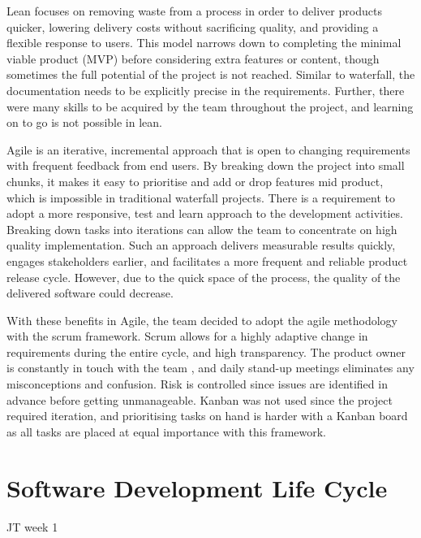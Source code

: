 Lean focuses on removing waste from a process in order to deliver products quicker, lowering delivery costs without sacrificing quality, and providing a flexible response to users. This model narrows down to completing the minimal viable product (MVP) before considering extra features or content, though sometimes the full potential of the project is not reached. Similar to waterfall, the documentation needs to be explicitly precise in the requirements. Further, there were many skills to be acquired by the team throughout the project, and learning on to go is not possible in lean.

Agile is an iterative, incremental approach that is open to changing requirements with frequent feedback from end users. By breaking down the project into small chunks, it makes it easy to prioritise and add or drop features mid product, which is impossible in traditional waterfall projects. There is a requirement to adopt a more responsive, test and learn approach to the development activities. Breaking down tasks into iterations can allow the team to concentrate on high quality implementation. Such an approach delivers measurable results quickly, engages stakeholders earlier, and facilitates a more frequent and reliable product release cycle. However, due to the quick space of the process, the quality of the delivered software could decrease.

With these benefits in Agile, the team decided to adopt the agile methodology with the scrum framework. Scrum allows for a highly adaptive change in requirements during the entire cycle, and high transparency. The product owner is constantly in touch with the team \cite{globalluxsoft}, and daily stand-up meetings eliminates any misconceptions and confusion. Risk is controlled since issues are identified in advance before getting unmanageable. Kanban was not used since the project required iteration, and prioritising tasks on hand is harder with a Kanban board as all tasks are placed at equal importance with this framework.

\section{Software Development Life Cycle}
JT week 1

